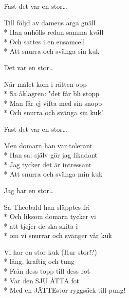 \begin{SongText}
\begin{SongVerse}
Fast det var en stor…
\end{SongVerse}
\begin{SongVerse}
Till följd av damens arga gnäll\\*%
Han anhölls redan samma kväll\\*%
Och sattes i en ensamcell\\*%
Att snurra och svänga sin kuk
\end{SongVerse}
\begin{SongVerse}
Det var en stor…
\end{SongVerse}
\begin{SongVerse}
När målet kom i rätten opp\\*%
Sa åklagren: "det får bli stopp\\*%
Man får ej vifta med sin snopp\\*%
Och snurra och svänga sin kuk"
\end{SongVerse}
\begin{SongVerse}
Fast det var en stor…
\end{SongVerse}
\begin{SongVerse}
Men domarn han var tolerant\\*%
Han sa: själv gör jag likadant\\*%
Jag tycker det är intressant\\*%
Att snurra och svänga min kuk
\end{SongVerse}
\begin{SongVerse}
Jag har en stor…
\end{SongVerse}
\begin{SongVerse}
Så Theobald han släpptes fri\\*%
Och liksom domarn tycker vi\\*%
att tjejer de ska skita i\\*%
om vi snurrar och svänger vår kuk
\end{SongVerse}
\begin{SongVerse}
Vi har en stor kuk (Hur stor!?)\\*%
lång, kraftig och tung\\*%
Från dess topp till dess rot\\*%
Var den SJU ÅTTA fot\\*%
Med en JÄTTEstor ryggsäck till pung!
\end{SongVerse}
\end{SongText}
